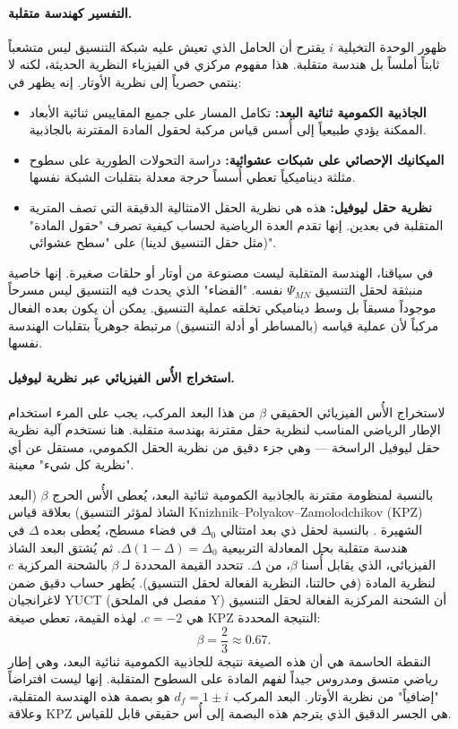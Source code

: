 \documentclass[12pt,a4paper]{article}
\theoremstyle{remark}
\begin{document}
	\paragraph{التفسير كهندسة متقلبة.}
	ظهور الوحدة التخيلية \(i\) يقترح أن الحامل الذي تعيش عليه شبكة التنسيق ليس متشعباً ثابتاً أملساً بل هندسة متقلبة. هذا مفهوم مركزي في الفيزياء النظرية الحديثة، لكنه لا ينتمي حصرياً إلى نظرية الأوتار. إنه يظهر في:
	\begin{itemize}
		\item \textbf{الجاذبية الكمومية ثنائية البعد:} تكامل المسار على جميع المقاييس ثنائية الأبعاد الممكنة يؤدي طبيعياً إلى أُسس قياس مركبة لحقول المادة المقترنة بالجاذبية.
		\item \textbf{الميكانيك الإحصائي على شبكات عشوائية:} دراسة التحولات الطورية على سطوح مثلثة ديناميكياً تعطي أُسساً حرجة معدلة بتقلبات الشبكة نفسها.
		\item \textbf{نظرية حقل ليوفيل:} هذه هي نظرية الحقل الامتثالية الدقيقة التي تصف المترية المتقلبة في بعدين. إنها تقدم العدة الرياضية لحساب كيفية تصرف "حقول المادة" (مثل حقل التنسيق لدينا) على "سطح عشوائي".
	\end{itemize}
	في سياقنا، الهندسة المتقلبة ليست مصنوعة من أوتار أو حلقات صغيرة. إنها خاصية منبثقة لحقل التنسيق \(\Psi_{MN}\) نفسه. "الفضاء" الذي يحدث فيه التنسيق ليس مسرحاً موجوداً مسبقاً بل وسط ديناميكي تخلقه عملية التنسيق. يمكن أن يكون بعده الفعال مركباً لأن عملية قياسه (بالمساطر أو أدلة التنسيق) مرتبطة جوهرياً بتقلبات الهندسة نفسها.
	
	\paragraph{استخراج الأُس الفيزيائي عبر نظرية ليوفيل.}
	لاستخراج الأُس الفيزيائي الحقيقي \(\beta\) من هذا البعد المركب، يجب على المرء استخدام الإطار الرياضي المناسب لنظرية حقل مقترنة بهندسة متقلبة. هنا نستخدم آلية نظرية حقل ليوفيل الراسخة — وهي جزء دقيق من نظرية الحقل الكمومي، مستقل عن أي "نظرية كل شيء" معينة.
	
	بالنسبة لمنظومة مقترنة بالجاذبية الكمومية ثنائية البعد، يُعطى الأُس الحرج \(\beta\) (البعد الشاذ لمؤثر التنسيق) بعلاقة قياس Knizhnik–Polyakov–Zamolodchikov (KPZ) الشهيرة \cite{Knizhnik1988}. بالنسبة لحقل ذي بعد امتثالي \(\Delta_0\) في فضاء مسطح، يُعطى بعده \(\Delta\) في هندسة متقلبة بحل المعادلة التربيعية \(\Delta(1-\Delta) = \Delta_0\). ثم يُشتق البعد الشاذ الفيزيائي، الذي يقابل أُسنا \(\beta\)، من \(\Delta\). تتحدد القيمة المحددة لـ \(\beta\) بالشحنة المركزية \(c\) لنظرية المادة (في حالتنا، النظرية الفعالة لحقل التنسيق). يُظهر حساب دقيق ضمن لاغرانجيان YUCT (مفصل في الملحق Y) أن الشحنة المركزية الفعالة لحقل التنسيق هي \(c = -2\). لهذه القيمة، تعطي صيغة KPZ النتيجة المحددة:
	\begin{equation}
		\beta = \frac{2}{3} \approx 0.67.
		\label{eq:beta_final}
	\end{equation}
	النقطة الحاسمة هي أن هذه الصيغة نتيجة للجاذبية الكمومية ثنائية البعد، وهي إطار رياضي متسق ومدروس جيداً لفهم المادة على السطوح المتقلبة. إنها ليست افتراضاً "إضافياً" من نظرية الأوتار. البعد المركب \(d_f = 1 \pm i\) هو بصمة هذه الهندسة المتقلبة، وعلاقة KPZ هي الجسر الدقيق الذي يترجم هذه البصمة إلى أُس حقيقي قابل للقياس.
	
\end{document}
